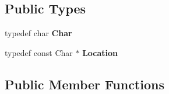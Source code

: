 \subsection*{Public Types}
\begin{DoxyCompactItemize}
\item 
\mbox{\label{classJson_1_1Reader_a3eec9118f3e9a672ba8348c3a79d0f45}} 
typedef char {\bfseries Char}
\item 
\mbox{\label{classJson_1_1Reader_a46795b5b272bf79a7730e406cb96375a}} 
typedef const Char $\ast$ {\bfseries Location}
\end{DoxyCompactItemize}
\subsection*{Public Member Functions}

